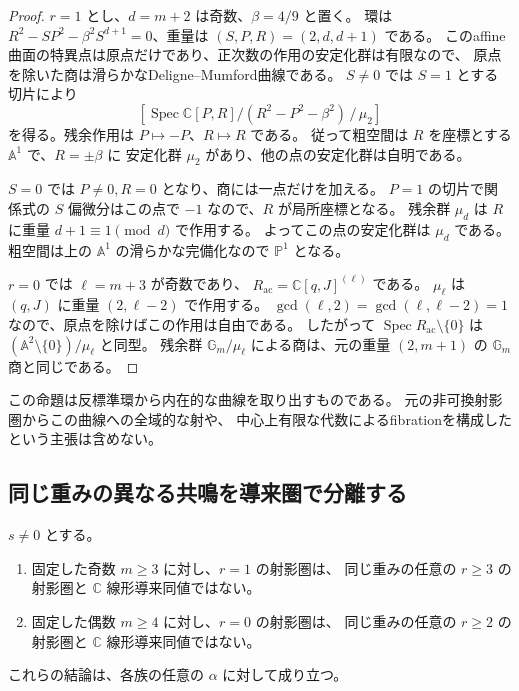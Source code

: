 \begin{proof}
$r=1$ とし、$d=m+2$ は奇数、$\beta=4/9$ と置く。
環は $R^2-SP^2-\beta^2S^{d+1}=0$、重量は $(S,P,R)=(2,d,d+1)$ である。
このaffine曲面の特異点は原点だけであり、正次数の作用の安定化群は有限なので、
原点を除いた商は滑らかなDeligne--Mumford曲線である。
$S\ne0$ では $S=1$ とする切片により
\[
 [\operatorname{Spec}\mathbb C[P,R]/(R^2-P^2-\beta^2)\,/\,\mu_2]
\]
を得る。残余作用は $P\mapsto-P$、$R\mapsto R$ である。
従って粗空間は $R$ を座標とする $\mathbb A^1$ で、$R=\pm\beta$ に
安定化群 $\mu_2$ があり、他の点の安定化群は自明である。

$S=0$ では $P\ne0,R=0$ となり、商には一点だけを加える。
$P=1$ の切片で関係式の $S$ 偏微分はこの点で $-1$ なので、$R$ が局所座標となる。
残余群 $\mu_d$ は $R$ に重量 $d+1\equiv1\pmod d$ で作用する。
よってこの点の安定化群は $\mu_d$ である。
粗空間は上の $\mathbb A^1$ の滑らかな完備化なので $\mathbb P^1$ となる。

$r=0$ では $\ell=m+3$ が奇数であり、
$R_{\mathrm{ac}}=\mathbb C[q,J]^{(\ell)}$ である。
$\mu_\ell$ は $(q,J)$ に重量 $(2,\ell-2)$ で作用する。
$\gcd(\ell,2)=\gcd(\ell,\ell-2)=1$ なので、原点を除けばこの作用は自由である。
したがって $\operatorname{Spec}R_{\mathrm{ac}}\setminus\{0\}$ は
$(\mathbb A^2\setminus\{0\})/\mu_\ell$ と同型。
残余群 $\mathbb G_m/\mu_\ell$ による商は、元の重量 $(2,m+1)$ の
$\mathbb G_m$ 商と同じである。
\end{proof}

この命題は反標準環から内在的な曲線を取り出すものである。
元の非可換射影圏からこの曲線への全域的な射や、
中心上有限な代数によるfibrationを構成したという主張は含めない。

\subsection{同じ重みの異なる共鳴を導来圏で分離する}

\begin{corollary}
\label{cor:derived-separation-v35}
$s\ne0$ とする。
\begin{enumerate}
\item 固定した奇数 $m\ge3$ に対し、$r=1$ の射影圏は、
同じ重みの任意の $r\ge3$ の射影圏と $\mathbb C$ 線形導来同値ではない。
\item 固定した偶数 $m\ge4$ に対し、$r=0$ の射影圏は、
同じ重みの任意の $r\ge2$ の射影圏と $\mathbb C$ 線形導来同値ではない。
\end{enumerate}
これらの結論は、各族の任意の $\alpha$ に対して成り立つ。
\end{corollary}

